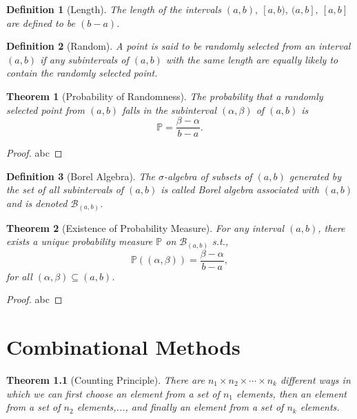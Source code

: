 \documentclass[openany,12pt]{book}
\newtheorem{theorem}{Theorem}[chapter]
\newtheorem{definition}{Definition}[chapter]
\begin{document}
\begin{definition}[Length]
The length of the intervals $(a,b),\ [a,b),\ (a,b],\ [a,b]$ are defined to be $(b-a)$.
\end{definition}

\begin{definition}[Random]
A point is said to be randomly selected from an interval $(a,b)$ if any subintervals of $(a,b)$ with the same length are equally likely to contain the randomly selected point.
\end{definition}

\begin{theorem}[Probability of Randomness]
The probability that a randomly selected point from $(a,b)$ falls in the subinterval $(\alpha,\beta)$ of $(a,b)$ is $$\mathbb{P}=\frac{\beta-\alpha}{b-a}.$$
\end{theorem}

\begin{proof}
  abc
\end{proof}

\begin{definition}[Borel Algebra]
The $\sigma$-algebra of subsets of $(a,b)$ generated by the set of all subintervals of $(a,b)$ is called Borel algebra associated with $(a,b)$ and is denoted $\mathcal{B}_{(a,b)}$.
\end{definition}

\begin{theorem}[Existence of Probability Measure]
For any interval $(a,b)$, there exists a unique probability measure $\mathbb{P}$ on $\mathcal{B}_{(a,b)}$ s.t., $$\mathbb{P}((\alpha,\beta))=\frac{\beta-\alpha}{b-a},$$
for all $(\alpha,\beta)\subseteq(a,b)$.
\end{theorem}

\begin{proof}
  abc
\end{proof}

\chapter{Combinational Methods}

\begin{theorem}[Counting Principle]
There are $n_1\times n_2\times\cdots\times n_k$ different ways in which we can first choose an element from a set of $n_1$  elements, then an element from a set of $n_2$ elements,..., and finally an element from a set of $n_k$ elements.
\end{theorem}
\end{document}
